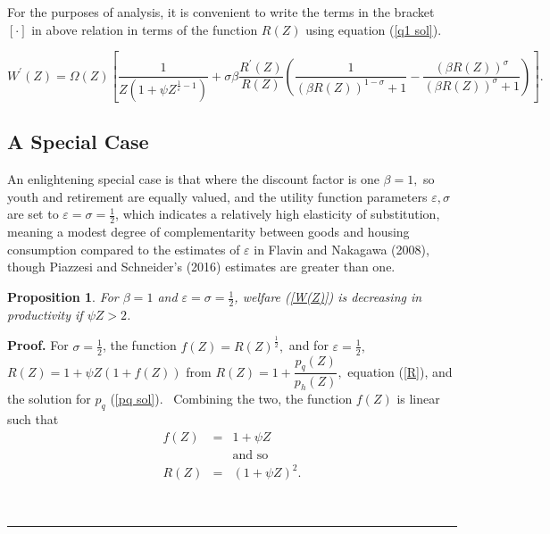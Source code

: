 \documentclass{article}
\newtheorem{proposition}[theorem]{Proposition}
\newenvironment{proof}[1][Proof]{\noindent\textbf{#1.} }{\ \rule{0.5em}{0.5em}}
\begin{document}
\begin{doublespace}
For the purposes of analysis, it is convenient to write the terms in the
bracket $\left[ \cdot \right] $ in above relation in terms of the function $%
R\left( Z\right) $ using equation (\ref{q1 sol}).

\begin{equation}
W^{\prime }\left( Z\right) =\Omega \left( Z\right) \left[ \frac{1}{Z\left(
1+\psi Z^{\frac{1}{\varepsilon }-1}\right) }+\sigma \beta \frac{R^{\prime
}\left( Z\right) }{R\left( Z\right) }\left( \frac{1}{\left( \beta R\left(
Z\right) \right) ^{1-\sigma }+1}-\frac{\left( \beta R\left( Z\right) \right)
^{\sigma }}{\left( \beta R\left( Z\right) \right) ^{\sigma }+1}\right) %
\right] .  \label{W'}
\end{equation}

\subsection{A Special Case}

An enlightening special case is that where the discount factor is one $\beta
=1,$ so youth and retirement are equally valued, and the utility function
parameters $\varepsilon ,\sigma $ are set to $\varepsilon =\sigma =\frac{1}{2%
}$, which indicates a relatively high elasticity of substitution, meaning a
modest degree of complementarity between goods and housing consumption
compared to the estimates of $\varepsilon $ in Flavin and Nakagawa (2008),
though Piazzesi and Schneider's (2016) estimates are greater than one.

\begin{proposition}
For $\beta =1$ and $\varepsilon =\sigma =\frac{1}{2}$, welfare (\ref{W(Z)})
is decreasing in productivity if $\psi Z>2$.
\end{proposition}

\begin{proof}
For $\sigma =\frac{1}{2}$, the function $f\left( Z\right) =R\left( Z\right)
^{\frac{1}{2}},$ and for $\varepsilon =\frac{1}{2},$ $R\left( Z\right)
=1+\psi Z\left( 1+f\left( Z\right) \right) $ from $R\left( Z\right) =1+%
\dfrac{p_{q}\left( Z\right) }{p_{h}\left( Z\right) },$ equation (\ref{R}),
and the solution for $p_{q}$ (\ref{pq sol}). \ Combining the two, the
function $f\left( Z\right) $ is linear such that 
\begin{eqnarray*}
f\left( Z\right) &=&1+\psi Z \\
&&\text{and so} \\
R\left( Z\right) &=&\left( 1+\psi Z\right) ^{2}.
\end{eqnarray*}


\end{proof}
\end{doublespace}
\end{document}
